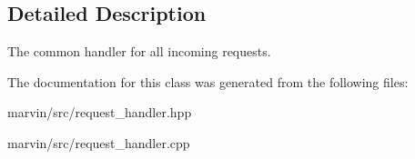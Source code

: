 \subsection{Detailed Description}
The common handler for all incoming requests. 

The documentation for this class was generated from the following files\+:\begin{DoxyCompactItemize}
\item 
marvin/src/request\+\_\+handler.\+hpp\item 
marvin/src/request\+\_\+handler.\+cpp\end{DoxyCompactItemize}
